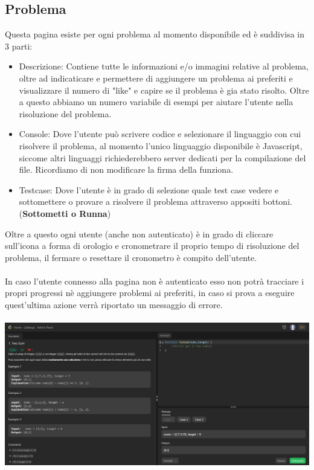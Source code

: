 \documentclass[11pt, a4paper]{article}
\theoremstyle{definition}
\begin{document}
\subsection{Problema}
Questa pagina esiste per ogni problema al momento disponibile ed è suddivisa in 3 parti:
\begin{itemize}
  \item Descrizione: Contiene tutte le informazioni e/o immagini relative al problema, oltre ad indicaticare e permettere di aggiungere un problema ai preferiti e visualizzare il numero di "like" e capire se il problema è gia stato risolto. Oltre a questo abbiamo un numero variabile di esempi per aiutare l'utente nella risoluzione del problema.
  \item Console: Dove l'utente può scrivere codice e selezionare il linguaggio con cui risolvere il problema, al momento l'unico linguaggio disponibile è Javascript, siccome altri linguaggi richiederebbero server dedicati per la compilazione del file. Ricordiamo di non modificare la firma della funziona.
  \item Testcase: Dove l'utente è in grado di selezione quale test case vedere e sottomettere o provare a risolvere il problema attraverso appositi bottoni. (\textbf{Sottometti o Runna})
\end{itemize}
Oltre a questo ogni utente (anche non autenticato) è in grado di cliccare sull'icona a forma di orologio e cronometrare il proprio tempo di risoluzione del problema, il fermare o resettare il cronometro è compito dell'utente.\\\\
In caso l'utente connesso alla pagina non è autenticato esso non potrà tracciare i propri progressi nè aggiungere problemi ai preferiti, in caso si prova a eseguire quest'ultima azione verrà riportato un messaggio di errore.\\\\
\includegraphics[width=\textwidth]{materiale/sito/Problema.png}
\end{document}
